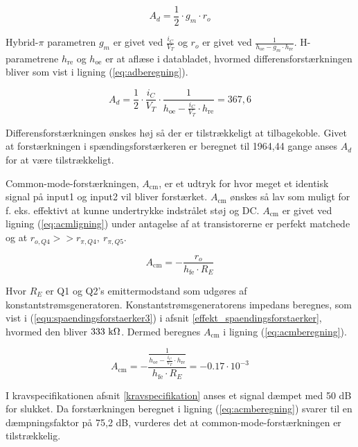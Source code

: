 \begin{equation}
A_d=\frac{1}{2} \cdot g_m \cdot r_o
\label{eq:diffforstaerkning}
\end{equation}

Hybrid-$\pi$ parametren $g_m$ er givet ved $\frac{i_C}{V_T}$ og $r_o$ er givet ved $\frac{1}{h_\mathrm{oe} - g_m \cdot h_\mathrm{re}}$. H-parametrene $h_\mathrm{re}$ og $h_\mathrm{oe}$ er at aflæse i databladet, hvormed differensforstærkningen bliver som vist i ligning (\ref{eq:adberegning}).

\begin{equation}
A_d=\frac{1}{2} \cdot \frac{i_C}{V_T} \cdot \frac{1}{h_\mathrm{oe} - \frac{i_C}{V_T} \cdot h_\mathrm{re}}=367,6
\label{eq:adberegning}
\end{equation}

Differensforstærkningen ønskes høj så der er tilstrækkeligt at tilbagekoble. Givet at forstærkningen i spændingsforstærkeren er beregnet til 1964,44 gange anses $A_d$ for at være tilstrækkeligt. 

Common-mode-forstærkningen, $A_\mathrm{cm}$, er et udtryk for hvor meget et identisk signal på input1 og input2 vil bliver forstærket. $A_\mathrm{cm}$ ønskes så lav som muligt for f. eks. effektivt at kunne undertrykke indstrålet støj og DC. $A_\mathrm{cm}$ er givet ved ligning (\ref{eq:acmligning}) \cite{sedra-smith-3} %
under antagelse af at transistorerne er perfekt matchede og  at $r_{o,Q4}>>r_{\pi,Q4},~r_{\pi,Q5}$. 

\begin{equation}
A_\mathrm{cm} = -\frac{r_o}{h_\mathrm{fe} \cdot R_E}
\label{eq:acmligning}
\end{equation}

Hvor $R_E$ er Q1 og Q2's emittermodstand som udgøres af konstantstrømsgeneratoren. Konstantstrømsgeneratorens impedans beregnes, som vist i (\ref{equ:spaendingsforstaerker3}) i afsnit \ref{effekt_spaendingsforstaerker}, hvormed den bliver $333~\mathrm{k}\ohm$. Dermed beregnes $A_\mathrm{cm}$ i ligning (\ref{eq:acmberegning}).

\begin{equation}
A_\mathrm{cm} = -\frac{\frac{1}{h_\mathrm{oe} - \frac{i_C}{V_T} \cdot h_\mathrm{re}}}{h_\mathrm{fe} \cdot R_E} = -0.17 \cdot 10^{-3}
\label{eq:acmberegning}
\end{equation}

I kravspecifikationen afsnit \ref{kravspecifikation} anses et signal dæmpet med 50 dB for slukket. Da forstærkningen beregnet i ligning (\ref{eq:acmberegning}) svarer til en dæmpningsfaktor på 75,2 dB, vurderes det at common-mode-forstærkningen er tilstrækkelig. 

